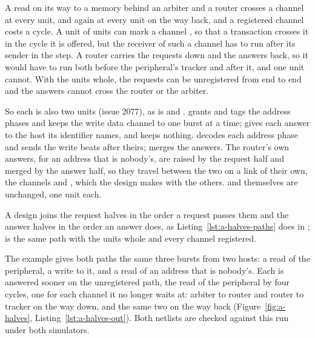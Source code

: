 \documentclass[journal,9pt]{IEEEtran}
\begin{document}
A read on its way to a memory behind an arbiter and a router crosses a
channel at every unit, and again at every unit on the way back, and a
registered channel costs a cycle. A unit of units can mark a channel
\code{\#[unregistered]}, so that a transaction crosses it in the cycle
it is offered, but the receiver of such a channel has to run after its
sender in the step. A router carries the requests down and the answers
back, so it would have to run both before the peripheral's tracker and
after it, and one unit cannot. With the units whole, the requests can
be unregistered from end to end and the answers cannot cross the
router or the arbiter.

So each is also two units (issue 2077), as  is
 and .  grants and
tags the address phases and keeps the write data channel to one burst
at a time;  gives each answer to the host its
identifier names, and keeps nothing.  decodes each
address phase and sends the write beats after theirs; 
merges the answers. The router's own answers, for an address that is
nobody's, are raised by the request half and merged by the answer
half, so they travel between the two on a link of their own, the
channels  and , which the design makes with the
others.  and  themselves are unchanged, one
unit each.

A design joins the request halves in the order a request passes them
and the answer halves in the order an answer does, as
Listing~\ref{lst:a-halves-paths} does in ;  is
the same path with the units whole and every channel registered.



The example gives both paths the same three bursts from two hosts: a
read of the peripheral, a write to it, and a read of an address that
is nobody's. Each is answered sooner on the unregistered path, the
read of the peripheral by four cycles, one for each channel it no
longer waits at: arbiter to router and router to tracker on the way
down, and the same two on the way back
(Figure~\ref{fig:a-halves}, Listing~\ref{lst:a-halves-out}). Both
netlists are checked against this run under both simulators.
\end{document}

